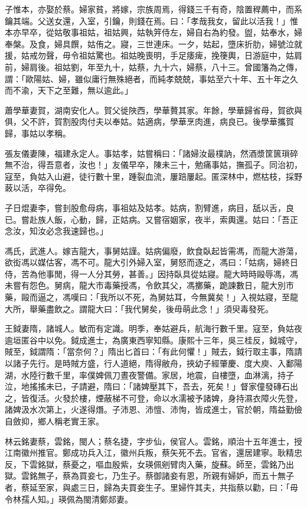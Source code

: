 \begin{pinyinscope}
子惟本，亦娶於蔡。婦家貧，將嫁，宗族周焉，得錢三千有奇，陰置稈薦中，而系鑰其端。父送女還，入室，引鑰，則錢在焉。曰：「孝哉我女，留此以活我！」惟本亦早卒，從姑敬事祖姑，祖姑興，姑執笄侍左，婦自右為約發。盥，姑奉水，婦奉槃。及食，婦具饌，姑侑之。寢，三世連床。一夕，姑起，墮床折肋，婦號泣就援，姑戒勿聲，毋令祖姑驚也。祖姑晚喪明，手足痿痺，挽箯輿，日游庭中，姑肩前，婦肩後。祖姑劉，年至九十，姑蔡，九十六，婦蔡，八十三。曾國籓為之傳，謂：「歐陽姑、婦，雖似庸行無殊絕者，而純孝兢兢，事姑至六十年、五十年之久而不渝，天下之至難，無以逾此。」

蕭學華妻賀，湖南安化人。賀父徙陜西，學華贅其家。年餘，學華歸省母，賀欲與俱，父不許，賀割股肉付夫以奉姑。姑適病，學華烹肉進，病良已。後學華攜賀歸，事姑以孝稱。

張友儀妻陳，福建永定人。事姑孝，姑嘗稱曰：「諸婦汝最樸訥，然酒漿筐篋瑣碎無不治，得吾意者，汝也！」友儀早卒，陳未三十，勉痛事姑，撫孤子。同治初，寇至，負姑入山避，徒行數十里，踵裂血流，屢踣屢起。匿深林中，燃枯枝，採野蓛以活，卒得免。

子日焜妻李，嘗刲股愈母病，事祖姑及姑孝。姑病，割臂進，病目，舐以舌，良已。嘗赴族人飯，心動，歸，正姑病。又嘗宿姻家，夜半，索輿還。姑曰：「吾正念汝，知汝必念我速歸也。」

馮氏，武進人。嫁吉龍大，事舅姑謹。姑病偏廢，飲食臥起皆需馮，而龍大游蕩，欲衒馮以媒估客，馮不可。龍大引外婦入室，舅怒而逐之，馮曰：「姑病，婦終日侍，苦為他事閒，得一人分其勞，甚善。」因持臥具從姑寢。龍大時時毆辱馮，馮未嘗有怨色。舅病，龍大市毒藥授馮，令飲其父，馮擲藥，跪諫數日，龍大別市藥，毆而逼之，馮嘆曰：「我所以不死，為舅姑耳，今無冀矣！」入視姑寢，至龍大所，舉藥盡飲之。謂龍大曰：「我代舅矣，後毋萌此念！」須臾毒發死。

王鉞妻隋，諸城人。敏而有定識。明季，奉姑避兵，航海行數千里。寇至，負姑夜逾垣匿谷中以免。鉞成進士，為廣東西寧知縣。康熙十三年，吳三桂反，鉞城守，賊至，鉞謂隋：「當奈何？」隋出匕首曰：「有此何懼！」賊去，鉞行取主事，隋請以諸子先行。是時賊方盛，行人道絕，隋得敝舟，挾幼子經肇慶、度大庾、入鄱陽湖，水陸行數千里，率僕婢佩刀晝夜警備。家居，地震，自樓墮，血淋漓，持子泣，地搖搖未已，子請避，隋曰：「諸婢壓其下，吾去，死矣！」督家僮發磚石出之，皆復活。火發於樓，煙蔽梯不可登，命以水濡被予諸婢，身持濕衣障火先登，諸婢汲水次第上，火遂得熸。子沛恩、沛憻、沛恂，皆成進士，官於朝，隋益勤儉自斂抑，鄉人稱老實王家。

林云銘妻蔡，雲銘，閩人；蔡名捷，字步仙，侯官人。雲銘，順治十五年進士，授江南徽州推官。鄭成功兵入江，徽州兵叛，蔡矢死不去。官省，還居建寧。耿精忠反，下雲銘獄，蔡憂之，嘔血殷紫，女瑛佩剜臂肉入藥，旋蘇。師至，雲銘乃出獄。雲銘無子，蔡為買妾七，乃生子。蔡御諸妾有恩，所親有婦妒，而五十無子者，蔡延至家，與處三日，歸為夫買妾生子。里婦忤其夫，共指蔡以勸，曰：「毋令林孺人知。」瑛佩為閩清鄭郯妻。


\end{pinyinscope}
